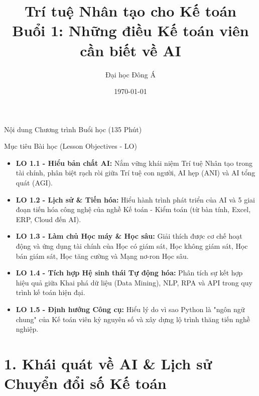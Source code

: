 \documentclass[aspectratio=169]{beamer}
\title[Buổi 1: AI \& Nghề Kế toán]{Trí tuệ Nhân tạo cho Kế toán \\ \vspace{0.3cm} \Large Buổi 1: Những điều Kế toán viên cần biết về AI}
\author{Đại học Đông Á}
\date{\today}
\begin{document}
\begin{frame}
    \titlepage
\end{frame}

\begin{frame}{Nội dung Chương trình Buổi học (135 Phút)}
    \tableofcontents
\end{frame}

\begin{frame}{Mục tiêu Bài học (Lesson Objectives - LO)}
    \begin{itemize}
        \item \textbf{LO 1.1 - Hiểu bản chất AI:} Nắm vững khái niệm Trí tuệ Nhân tạo trong tài chính, phân biệt rạch ròi giữa Trí tuệ con người, AI hẹp (ANI) và AI tổng quát (AGI).
        \item \textbf{LO 1.2 - Lịch sử \& Tiến hóa:} Hiểu hành trình phát triển của AI và 5 giai đoạn tiến hóa công nghệ của nghề Kế toán - Kiểm toán (từ bàn tính, Excel, ERP, Cloud đến AI).
        \item \textbf{LO 1.3 - Làm chủ Học máy \& Học sâu:} Giải thích được cơ chế hoạt động và ứng dụng tài chính của Học có giám sát, Học không giám sát, Học bán giám sát, Học tăng cường và Mạng nơ-ron Học sâu.
        \item \textbf{LO 1.4 - Tích hợp Hệ sinh thái Tự động hóa:} Phân tích sự kết hợp hiệu quả giữa Khai phá dữ liệu (Data Mining), NLP, RPA và API trong quy trình kế toán hiện đại.
        \item \textbf{LO 1.5 - Định hướng Công cụ:} Hiểu lý do vì sao Python là "ngôn ngữ chung" của Kế toán viên kỷ nguyên số và xây dựng lộ trình thăng tiến nghề nghiệp.
    \end{itemize}
\end{frame}

\section{1. Khái quát về AI \& Lịch sử Chuyển đổi số Kế toán}
\end{document}
